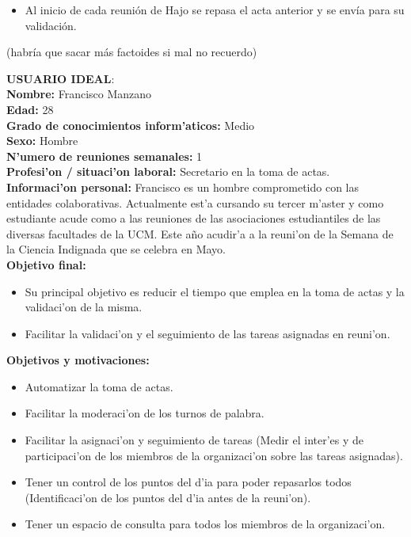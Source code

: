\documentclass{article}
\begin{document}
\begin{itemize}
\begin{itemize}
\begin{shaded}
\begin{itemize}
					\item Al inicio de cada reunión de Hajo se repasa el acta anterior y se envía para su validación.
				\end{itemize}
			\end{shaded}
		(habría que sacar más factoides si mal no recuerdo)
		\newpage
		\begin{shaded}
			\textbf{USUARIO IDEAL}: \\
				\textbf{Nombre:} Francisco Manzano\\
				\textbf{Edad:} 28\\
				\textbf{Grado de conocimientos inform'aticos:} Medio\\
				\textbf{Sexo:} Hombre\\
				\textbf{N'umero de reuniones semanales:} 1\\
				\textbf{Profesi'on / situaci'on laboral:} Secretario en la toma de actas.\\
				\textbf{Informaci'on personal:} Francisco es un hombre comprometido con las entidades colaborativas. Actualmente est'a cursando su tercer m'aster y como estudiante acude como a las reuniones de las asociaciones estudiantiles de las diversas facultades de la UCM. Este año acudir'a a la reuni'on de la Semana de la Ciencia Indignada que se celebra en Mayo. \\
				\textbf{Objetivo final:}
					\begin{itemize}
						\item Su principal objetivo es reducir el tiempo que emplea en la toma de actas y la validaci'on de la misma.
						\item Facilitar la validaci'on y el seguimiento de las tareas asignadas en reuni'on.
					\end{itemize}
				\textbf{Objetivos y motivaciones:}
					\begin{itemize}
						\item Automatizar la toma de actas.
						\item Facilitar la moderaci'on de los turnos de palabra.
						\item Facilitar la asignaci'on y seguimiento de tareas (Medir el inter'es y de participaci'on de los miembros de la organizaci'on sobre las tareas asignadas).
						\item Tener un control de los puntos del d'ia para poder repasarlos todos (Identificaci'on de los puntos del d'ia antes de la reuni'on).
						\item Tener un espacio de consulta para todos los miembros de la organizaci'on.

\end{itemize}
\end{shaded}
\end{itemize}
\end{itemize}
\end{document}
